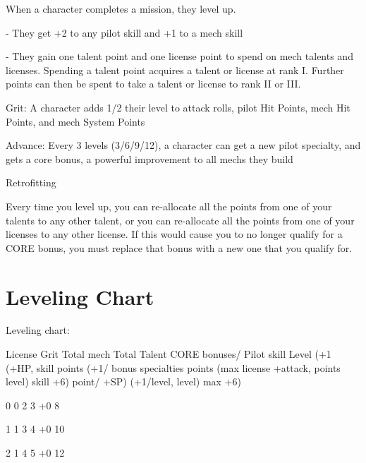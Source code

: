 When a character completes a mission, they level up. 
 
             -   They get +2 to any pilot skill and +1 to a mech skill
 
             -   They gain one talent point and one license point to spend on mech talents and  
                 licenses. Spending a talent point acquires a talent or license at rank I. Further  
                 points can then be spent to take a talent or license to rank II or III.
 

                                                                                                                


Grit: A character adds 1/2 their level to attack rolls, pilot Hit Points, mech Hit Points, and mech  
System Points
 
Advance: Every 3 levels (3/6/9/12), a character can get a new pilot specialty, and gets a core  
bonus, a powerful improvement to all mechs they build
 

                                              Retrofitting  

Every time you level up, you can re-allocate all the points from one of your talents to any other  
talent, or you can re-allocate all the points from one of your licenses to any other license. If this  
would cause you to no longer qualify for a CORE bonus, you must replace that bonus with a new  
one that you qualify for.
 
\chapter{Leveling Chart}
 
 Leveling chart:  

       License
   Grit        Total mech       Total Talent  CORE bonuses/           Pilot skill  
       Level (+1   (+HP,      skill
           points (+1/   bonus specialties       points (max  
       license    +attack,    points
          level)                                skill +6) 
       point/     +SP)        (+1/level,  
       level)                 max +6) 

       0           0           2               3              +0                     8 

       1           1           3               4              +0                      10 

       2           1           4               5              +0                      12 

